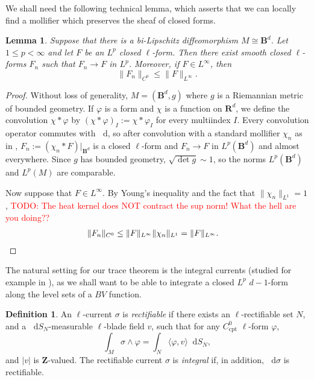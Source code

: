 \documentclass[reqno,11pt]{amsart}
\newcommand{\ZZ}{\mathbf{Z}}
\newcommand{\RR}{\mathbf{R}}
\newcommand{\Ball}{\mathbf{B}}
\newcommand*\dif{\mathop{}\!\mathrm{d}}
\newcommand{\dfn}[1]{\emph{#1}\index{#1}}
\newcommand{\cpt}{\mathrm{cpt}}
\newtheorem{lemma}[theorem]{Lemma}
\theoremstyle{definition}
\newtheorem{definition}[theorem]{Definition}
\numberwithin{equation}{section}
\newcommand\todo[1]{\textcolor{red}{TODO: #1}}
\begin{document}
We shall need the following technical lemma, which asserts that we can locally find a mollifier which preserves the sheaf of closed forms.

\begin{lemma}\label{mollification of closed forms}
Suppose that there is a bi-Lipschitz diffeomorphism $M \cong \Ball^d$.
Let $1 \leq p < \infty$ and let $F$ be an $L^p$ closed $\ell$-form.
Then there exist smooth closed $\ell$-forms $F_n$ such that $F_n \to F$ in $L^p$.
Moreover, if $F \in L^\infty$, then
\begin{equation}\label{heat kernel contracts sup norm}
\|F_n\|_{C^0} \leq \|F\|_{L^\infty}.
\end{equation}
\end{lemma}
\begin{proof}
Without loss of generality, $M = (\Ball^d, g)$ where $g$ is a Riemannian metric of bounded geometry.
If $\varphi$ is a form and $\chi$ is a function on $\RR^d$, we define the convolution $\chi * \varphi$ by $(\chi * \varphi)_I := \chi * \varphi_I$ for every multiindex $I$.
Every convolution operator commutes with $\dif$, so after convolution with a standard mollifier $\chi_n$ as in \cite[Appendix C, Theorem 6]{evans2010partial}, $F_n := (\chi_n * F)|_{\Ball^d}$ is a closed $\ell$-form and $F_n \to F$ in $L^p(\Ball^d)$ and almost everywhere.
Since $g$ has bounded geometry, $\sqrt{\det g} \sim 1$, so the norms $L^p(\Ball^d)$ and $L^p(M)$ are comparable.

Now suppose that $F \in L^\infty$.
By Young's inequality and the fact that $\|\chi_n\|_{L^1} = 1$, \todo{The heat kernel does NOT contract the sup norm! What the hell are you doing??}
\begin{align*}
\|F_n\|_{C^0} &\leq \|F\|_{L^\infty} \|\chi_n\|_{L^1} = \|F\|_{L^\infty}. \qedhere
\end{align*}
\end{proof}

The natural setting for our trace theorem is the integral currents (studied for example in \cite[\S27]{Simon84}), as we shall want to be able to integrate a closed $L^p$ $d - 1$-form along the level sets of a $BV$ function.

\begin{definition}
An $\ell$-current $\sigma$ is \dfn{rectifiable} if there exists an $\ell$-rectifiable set $N$, and a $\dif S_N$-measurable $\ell$-blade field $v$, such that for any $C^0_\cpt$ $\ell$-form $\varphi$,
$$\int_M \sigma \wedge \varphi = \int_N \langle \varphi, v\rangle \dif S_N,$$
and $|v|$ is $\ZZ$-valued.
The rectifiable current $\sigma$ is \dfn{integral} if, in addition, $\dif \sigma$ is rectifiable.
\end{definition}
\end{document}
